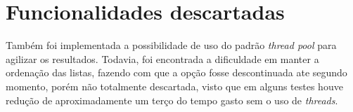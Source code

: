 \section{Funcionalidades descartadas}

Também foi implementada a possibilidade de uso do padrão \textit{thread pool} para agilizar os resultados. Todavia, foi encontrada a dificuldade em manter a ordenação das listas, fazendo com que a opção fosse descontinuada ate segundo momento, porém não totalmente descartada, visto que em alguns testes houve redução de aproximadamente um terço do tempo gasto sem o uso de \textit{threads}. 
